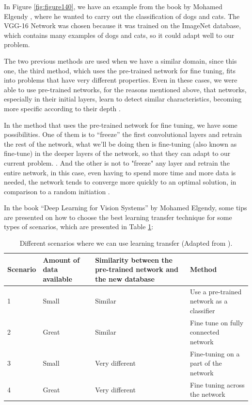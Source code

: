 In Figure \ref{fig:figure140}, we have an example from the book by Mohamed Elgendy \cite{elgendy2020}, where he wanted to carry out the classification of dogs and cats. The VGG-16 Network was chosen because it was trained on the ImageNet database, which contains many examples of dogs and cats, so it could adapt well to our problem.

The two previous methods are used when we have a similar domain, since this one, the third method, which uses the pre-trained network for fine tuning, fits into problems that have very different properties. Even in these cases, we were able to use pre-trained networks, for the reasons mentioned above, that networks, especially in their initial layers, learn to detect similar characteristics, becoming more specific according to their depth \cite{elgendy2020}.

In the method that uses the pre-trained network for fine tuning, we have some possibilities. One of them is to “freeze” the first convolutional layers and retrain the rest of the network, what we'll be doing then is fine-tuning (also known as fine-tune) in the deeper layers of the network, so that they can adapt to our current problem. . And the other is not to "freeze" any layer and retrain the entire network, in this case, even having to spend more time and more data is needed, the network tends to converge more quickly to an optimal solution, in comparison to a random initiation \cite{elgendy2020}.

In the book “Deep Learning  for Vision Systems” by Mohamed Elgendy, some tips are presented on how to choose the best learning transfer technique for some types of scenarios, which are presented in Table \ref{table:compareMethods}:

\begin{center}
\begin{table}
    \begin{tabular}{| m{} | m{} | m{} | m{} |} \hline
        \textbf{Scenario}& \textbf{Amount of data available}& \textbf{Similarity between the pre-trained network and the new database}& \textbf{Method}\\ \hline
        
        1& Small& Similar& Use a pre-trained network as a classifier\\ \hline
        2& Great& Similar& Fine tune on fully connected network\\ \hline
        3& Small& Very different& Fine-tuning on a part of the network\\ \hline
        4& Great& Very different& Fine tuning across the network\\ \hline
    \end{tabular}
    \caption{Different scenarios where we can use learning transfer (Adapted from \cite{elgendy2020}).}

    \label{table:compareMethods}
\end{table}
\end{center}


